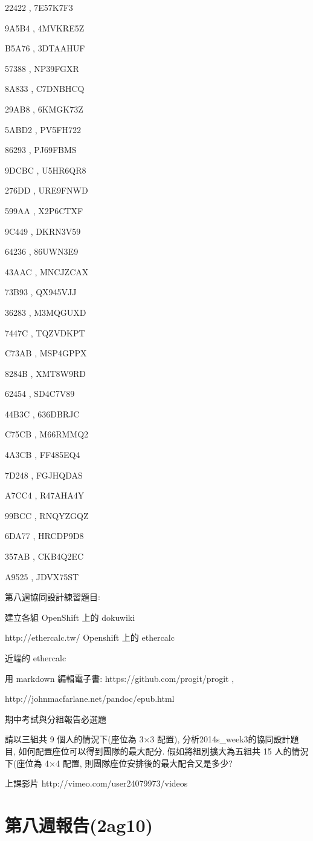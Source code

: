 \documentclass[]{article}
\begin{document}
22422 , 7E57K7F3

9A5B4 , 4MVKRE5Z

B5A76 , 3DTAAHUF

57388 , NP39FGXR

8A833 , C7DNBHCQ

29AB8 , 6KMGK73Z

5ABD2 , PV5FH722

86293 , PJ69FBMS

9DCBC , U5HR6QR8

276DD , URE9FNWD

599AA , X2P6CTXF

9C449 , DKRN3V59

64236 , 86UWN3E9

43AAC , MNCJZCAX

73B93 , QX945VJJ

36283 , M3MQGUXD

7447C , TQZVDKPT

C73AB , MSP4GPPX

8284B , XMT8W9RD

62454 , SD4C7V89

44B3C , 636DBRJC

C75CB , M66RMMQ2

4A3CB , FF485EQ4

7D248 , FGJHQDAS

A7CC4 , R47AHA4Y

99BCC , RNQYZGQZ

6DA77 , HRCDP9D8

357AB , CKB4Q2EC

A9525 , JDVX75ST

第八週協同設計練習題目:

建立各組 OpenShift 上的 dokuwiki

http://ethercalc.tw/ Openshift 上的 ethercalc

近端的 ethercalc

用 markdown 編輯電子書: https://github.com/progit/progit ,

http://johnmacfarlane.net/pandoc/epub.html

期中考試與分組報告必選題

請以三組共 9 個人的情況下(座位為 3×3 配置),
分析2014s\_week3的協同設計題目, 如何配置座位可以得到團隊的最大配分.
假如將組別擴大為五組共 15 人的情況下(座位為 4×4 配置,
則團隊座位安排後的最大配合又是多少?

上課影片 http://vimeo.com/user24079973/videos

\section{第八週報告(2ag10)}\label{ux7b2cux516bux9031ux5831ux544a2ag10}
\end{document}
